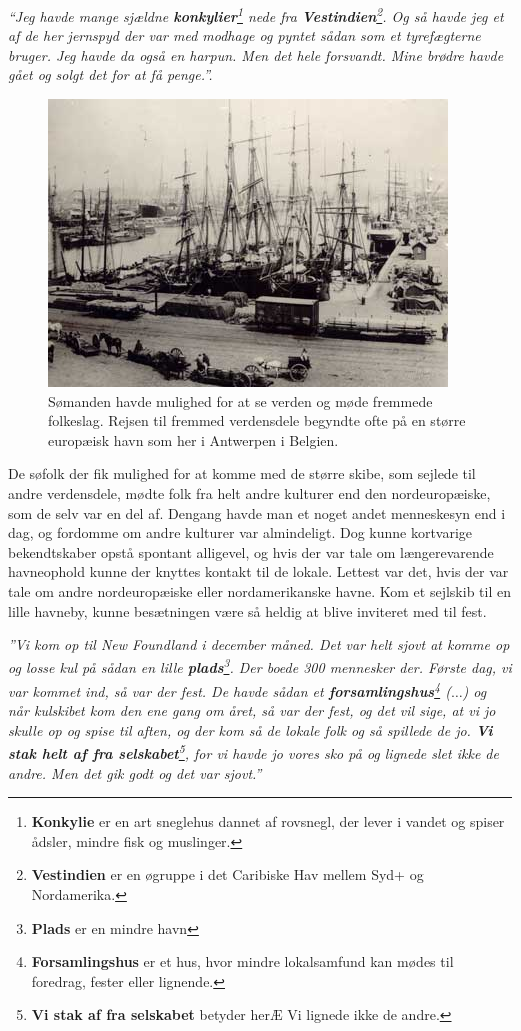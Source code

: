 \emph{``Jeg havde mange sjældne \textbf{konkylier}\footnote{\textbf{Konkylie}
  er en art sneglehus dannet af rovsnegl, der lever i vandet og spiser
  ådsler, mindre fisk og muslinger.} nede fra
\textbf{Vestindien}\footnote{\textbf{Vestindien} er en øgruppe i det
  Caribiske Hav mellem Syd+ og Nordamerika.}. Og så havde jeg et af de
her jernspyd der var med modhage og pyntet sådan som et tyrefægterne
bruger. Jeg havde da også en harpun. Men det hele forsvandt. Mine brødre
havde gået og solgt det for at få penge.''.}

\begin{figure}
\centering
\includegraphics{images/sejlskibe_tema-7-antwerpen.jpg}
\caption{Sømanden havde mulighed for at se verden og møde fremmede
folkeslag. Rejsen til fremmed verdensdele begyndte ofte på en større
europ\ae isk havn som her i Antwerpen i Belgien.}
\end{figure}

De søfolk der fik mulighed for at komme med de større skibe, som sejlede
til andre verdensdele, mødte folk fra helt andre kulturer end den
nordeuropæiske, som de selv var en del af. Dengang havde man et noget
andet menneskesyn end i dag, og fordomme om andre kulturer var
almindeligt. Dog kunne kortvarige bekendtskaber opstå spontant
alligevel, og hvis der var tale om længerevarende havneophold kunne der
knyttes kontakt til de lokale. Lettest var det, hvis der var tale om
andre nordeuropæiske eller nordamerikanske havne. Kom et sejlskib til en
lille havneby, kunne besætningen være så heldig at blive inviteret med
til fest.

\emph{''Vi kom op til New Foundland i december måned. Det var helt sjovt
at komme op og losse kul på sådan en lille \textbf{plads}\footnote{\textbf{Plads}
  er en mindre havn}. Der boede 300 mennesker der. Første dag, vi var
kommet ind, så var der fest. De havde sådan et
\textbf{forsamlingshus}\footnote{\textbf{Forsamlingshus} er et hus, hvor
  mindre lokalsamfund kan mødes til foredrag, fester eller lignende.}
(\(\ldots\)) og når kulskibet kom den ene gang om året, så var der fest,
og det vil sige, at vi jo skulle op og spise til aften, og der kom så de
lokale folk og så spillede de jo. \textbf{Vi stak helt af fra
selskabet}\footnote{\textbf{Vi stak af fra selskabet} betyder herÆ Vi
  lignede ikke de andre.}, for vi havde jo vores sko på og lignede slet
ikke de andre. Men det gik godt og det var sjovt.''}

